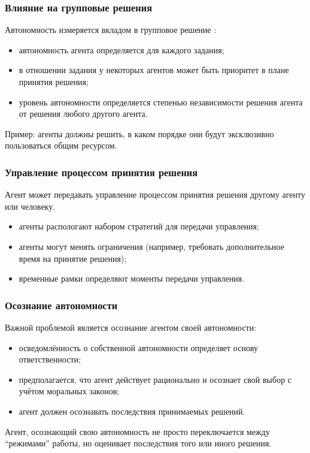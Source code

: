 \documentclass{beamer}
\begin{document}
\begin{frame}
  \frametitle{Влияние на групповые решения}
  Автономность измеряется вкладом в групповое решение \cite{Martin2006}:
  \begin{itemize}
    \item автономность агента определяется для каждого задания;
    \item в отношении задания у некоторых агентов может быть
      приоритет в плане принятия решения;
    \item уровень автономности определяется степенью независимости
      решения агента от решения любого другого агента.
  \end{itemize}

  Пример: агенты должны решить, в каком порядке они будут эксклюзивно
  пользоваться общим ресурсом.
\end{frame}

\begin{frame}
  \frametitle{Управление процессом принятия решения}
  Агент может передавать управление процессом принятия решения \cite{Scerri2004} другому агенту или человеку.
  \begin{itemize}
    \item агенты распологают набором стратегий для передачи управления;
    \item агенты могут менять ограничения (например,
      требовать дополнительное время на принятие решения);
    \item временные рамки определяют моменты передачи управления.
  \end{itemize}
\end{frame}

\begin{frame}
  \frametitle{Осознание автономности}
  Важной проблемой является осознание агентом своей автономности:
  \begin{itemize}
    \item осведомлённость о собственной автономности определяет основу ответственности;
    \item предполагается, что агент действует рационально и осознает свой выбор
      с учётом моральных законов;
    \item агент должен осознавать последствия принимаемых решений.
  \end{itemize}

  Агент, осознающий свою автономность не просто переключается между ``режимами'' работы,
  но оценивает последствия того или иного решения.
\end{frame}
\end{document}
